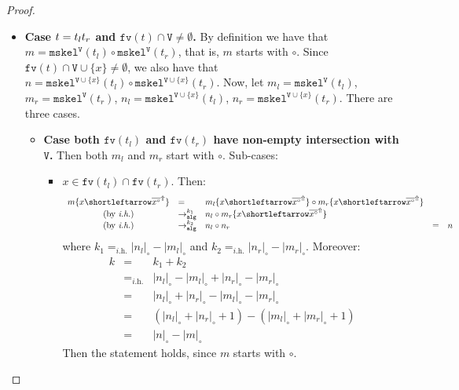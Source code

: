 \documentclass[10pt,a4paper]{article}
\theoremstyle{remark}
\newcommand{\tm}{t}
\newcommand{\var}{x}
\newcommand{\ap}[2]{#1[#2]}
\renewcommand{\ap}[2]{#1#2}
\newcommand{\Rew}[1]{\rightarrow_{#1}}
\newcommand{\symfont}[1]{\mathtt{#1}}
\newcommand{\isub}[2]{\{#1{\shortleftarrow}#2\}}
\newcommand{\ih}{{\textit{i.h.}}\xspace}
\newcommand{\fv}[1]{\symfont{fv}(#1)}
\newcommand{\sizep}[2]{|#1|_{#2}}
\newcommand{\case}[1]{{\bf Case #1.}}
\newcommand{\taken}{\circ}
\newcommand{\frontiersym}{\Uparrow}
\newcommand{\skelu}[1]{\overline{#1}^{\frontiersym}}
\newcommand{\appt}{\taken}
\newcommand{\tomark}{\Rew{\symfont{alg}}}
\newcommand{\mtm}{m}
\newcommand{\mtmtwo}{n}
\newcommand{\disc}[2]{\symfont{disc}^{#2}(#1)}
\renewcommand{\disc}[2]{\symfont{mskel}^{#2}(#1)}
\newcommand{\skelvars}{\theta}
\renewcommand{\skelvars}{\symfont{V}}
\newcommand{\sizet}[1]{\sizep{#1}{\taken}}
\begin{document}
\begin{proof}
\begin{itemize}
\item \case{$\tm = {\tm_l}\ap{\tm_r}$ and $\fv{\tm} \cap \skelvars \neq \emptyset$} By definition we have that $\mtm = \disc{\tm_l}\skelvars \appt \disc{\tm_r}\skelvars$, that is, $\mtm$ starts with $\taken$. Since $\fv{\tm} \cap \skelvars \cup \{\var\} \neq \emptyset$, we also have that $\mtmtwo = \disc{\tm_l}{\skelvars\cup\{\var\}}\appt\disc{\tm_r}{\skelvars\cup\{\var\}}$. Now, let $\mtm_l = \disc{\tm_l}\skelvars$, $\mtm_r = \disc{\tm_r}\skelvars$, $\mtmtwo_l = \disc{\tm_l}{\skelvars\cup\{\var\}}$, $\mtmtwo_r = \disc{\tm_r}{\skelvars\cup\{\var\}}$. There are three cases.
\begin{itemize}
\item \case{both $\fv{\tm_l}$ and $\fv{\tm_r}$ have non-empty intersection with $\skelvars$} Then both $\mtm_l$ and $\mtm_r$ start with $\taken$. Sub-cases:
\begin{itemize}
\item $\var \in \fv{\tm_l} \cap \fv{\tm_r}$. 
Then:
\[\begin{array}{cllllll}
\mtm\isub\var{\skelu{\var^\taken}}
  &= & 
  \mtm_l\isub\var{\skelu{\var^\taken}}\appt\mtm_r\isub\var{\skelu{\var^\taken}} 
  \\
   \mbox{(by \ih)}  &\tomark^{k_1} &
\mtmtwo_l\appt \mtm_r\isub\var{\skelu{\var^\taken}} 
  \\
    \mbox{(by \ih)}  &\tomark^{k_2} &
  \mtmtwo_l \appt \mtmtwo_r
  &=&
  \mtmtwo
\end{array}\]
where $k_1 =_{\ih} \sizet{\mtmtwo_l} - \sizet{\mtm_l}$ and $k_2 =_{\ih} \sizet{\mtmtwo_r} - \sizet{\mtm_r}$. 
Moreover:
\[\begin{array}{lllllll}
k & = & k_1 + k_2
\\
& =_{\ih} & 
\sizet{\mtmtwo_l} - \sizet{\mtm_l} + \sizet{\mtmtwo_r} - \sizet{\mtm_r}
\\
& = & 
\sizet{\mtmtwo_l} +\sizet{\mtmtwo_r} - \sizet{\mtm_l} - \sizet{\mtm_r}
\\
& = & 
(\sizet{\mtmtwo_l} +\sizet{\mtmtwo_r}+1) - (\sizet{\mtm_l} + \sizet{\mtm_r}+1)
\\
& = & 
\sizet{\mtmtwo} - \sizet{\mtm}
\end{array}\]
Then the statement holds, since $\mtm$ starts with $\taken$.



\end{itemize}
\end{itemize}
\end{itemize}
\end{proof}
\end{document}
